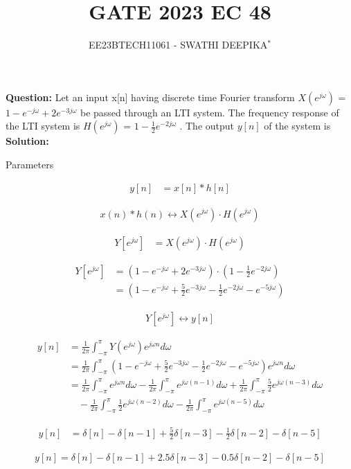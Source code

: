 \documentclass[journal,12pt,twocolumn]{IEEEtran}
\title{
	
\title{GATE 2023 EC 48}
\author{EE23BTECH11061 - SWATHI DEEPIKA$^{*}$%
}


}
\theoremstyle{remark}
\newcommand{\solution}{\noindent \textbf{Solution: }}
\begin{document}
\maketitle

\textbf{Question:} 
Let an input x[n] having discrete time Fourier transform
 $X(e^{j\omega})$  = $1 - e^{-j\omega} + 2e^{-3j\omega}$  be passed through an LTI system. The frequency response of the LTI system is  $H(e^{j\omega})$ = $1 - \frac{1}{2} e^{-2j\omega}$ . The output $y[n]$ of the system is \\  
\solution

 \begin{table}[h]
 	\centering
 	\resizebox{6 cm}{!}{
 		
 	}
 	\vspace{6 pt}
 	\caption{Parameters}
 	\label{tab:swag_tabel} 
 \end{table}
 
\begin{align}
y[n] &= x[n] * h[n]
\end{align}

\begin{align*}
x(n) * h(n) \longleftrightarrow X(e^{j\omega}) \cdot H(e^{j\omega})
\end{align*}

\begin{align}
Y[e^{j\omega}] &= X(e^{j\omega}) \cdot H(e^{j\omega})
\end{align}

\begin{align}
Y[e^{j\omega}] &= (1 - e^{-j\omega} + 2e^{-3j\omega}) \cdot \left(1 - \frac{1}{2}e^{-2j\omega}\right) \\
&= (1 - e^{-j\omega} + \frac{5}{2}e^{-3j\omega} - \frac{1}{2}e^{-2j\omega} - e^{-5j\omega})
\end{align}

\begin{align*}
Y[e^{j\omega}] \longleftrightarrow y[n]
\end{align*}

\begin{align}
y[n] &= \frac{1}{2\pi}\int_{-\pi}^{\pi} Y(e^{j\omega})e^{j\omega n} d\omega \\
&= \frac{1}{2\pi}\int_{-\pi}^{\pi} \left(1 - e^{-j\omega} + \frac{5}{2}e^{-3j\omega} - \frac{1}{2}e^{-2j\omega} - e^{-5j\omega}\right)e^{j\omega n} d\omega \\
&= \frac{1}{2\pi}\int_{-\pi}^{\pi} e^{j\omega n} d\omega - \frac{1}{2\pi}\int_{-\pi}^{\pi} e^{j\omega(n-1)} d\omega +\frac{1}{2\pi}\int_{-\pi}^{\pi} \frac{5}{2}e^{j\omega (n-3)} d\omega \\
&\quad - \frac{1}{2\pi}\int_{-\pi}^{\pi} \frac{1}{2}e^{j\omega (n-2)} d\omega - \frac{1}{2\pi}\int_{-\pi}^{\pi} e^{j\omega (n-5)} d\omega 
\end{align}


\begin{align}
 y[n] &= \delta[n] - \delta[n-1] + \frac{5}{2}\delta[n-3] - \frac{1}{2}\delta[n-2] - \delta[n-5]
\end{align}

\begin{align}
y[n] = \delta[n] - \delta[n-1] + 2.5\delta[n-3] - 0.5\delta[n-2] - \delta[n-5] 
\end{align}
\end{document}
